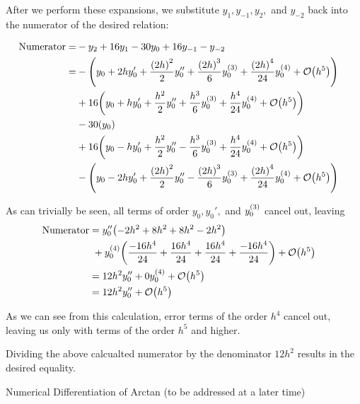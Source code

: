 \documentclass[12pt]{article}
\newenvironment{ex}[2][Exercise]{\begin{trivlist}
\item[\hskip \labelsep {\bfseries #1}\hskip \labelsep {\bfseries #2.}]}{\end{trivlist}}
\DeclarePairedDelimiter\rb{(}{)}
\begin{document}
After we perform these expansions, we substitute \(y_{1},y_{-1},y_{2},\) and \(y_{-2}\) back into the numerator of the desired relation:

\begin{align*}
	\text{Numerator}  = & - y_{2} + 16 y_{1} - 30y_{0} + 16 y_{-1} - y_{-2} &\\
	= & - \rb*{
y_{0} + 2h y_{0}' + \frac{\rb*{2h}^{2}}{2} y_{0}''
	+ \frac{\rb*{2h}^{3}}{6} y_{0}^{\rb*{3}}
	+ \frac{\rb*{2h}^{4}}{24} y_{0}^{\rb*{4} } + \mathcal{O} \rb*{h^{5}} 
	} &\\
	& + 16 \rb*{
y_{0} + h y_{0}' + \frac{h^{2}}{2} y_{0}''
	+ \frac{h^{3}}{6} y_{0}^{\rb*{3}}
	+ \frac{h^{4}}{24} y_{0}^{\rb*{4}} + \mathcal{O} \rb*{h^{5}} 
	} &\\
	& - 30 \rb*{
		y_{0}
	} &\\
	& + 16 \rb*{
y_{0} - h y_{0}' + \frac{h^{2}}{2} y_{0}''
	- \frac{h^{3}}{6}y_{0}^{\rb*{3}}
	+ \frac{h^{4}}{24} y_{0}^{\rb*{4}} + \mathcal{O} \rb*{h^{5}} 
	} &\\
	& - \rb*{
y_{0} - 2h y_{0}' + \frac{\rb*{2h}^{2}}{2} y_{0}''
	- \frac{\rb*{2h}^{3}}{6} y_{0}^{\rb*{3}}
	+ \frac{\rb*{2h}^{4}}{24} y_{0}^{\rb*{4} } + \mathcal{O} \rb*{h^{5}} 
	} &\\
\end{align*}

As can trivially be seen, all terms of order \(y_{0}, y_{0}',\) and \(y_{0}^{\rb*{3}}\) cancel out, leaving
\begin{align*}
	\text{Numerator} & = y_{0}'' \rb*{-2 h^{2} + 8 h^{2} + 8 h^{2} - 2 h^{2}} &\\
& \text{       } + y_{0}^{\rb*{4} } \rb*{ \frac{-16 h^{4}}{24} + \frac{16 h^{4}}{24} + \frac{16 h^{4}}{24} + \frac{-16 h^{4}}{24}} + \mathcal{O} \rb*{h^{5}}&\\
	& = 12 h^{2} y_{0}'' + 0 y_{0}^{\rb*{4}} + \mathcal{O} \rb*{ h^{5}} &\\
	& = 12 h^{2} y_{0}'' + \mathcal{O} \rb*{h^{5}} &\\
\end{align*}

As we can see from this calculation, error terms of the order \(h^{4}\) cancel out, leaving us only with terms of the order \(h^{5}\) and higher.

Dividing the above calcualted numerator by the denominator \(12 h^{2}\) results in the desired equality. 


\newpage

\begin{ex}
	3 Numerical Differentiation of Arctan (to be addressed at a later time)
\end{ex}
\end{document}
